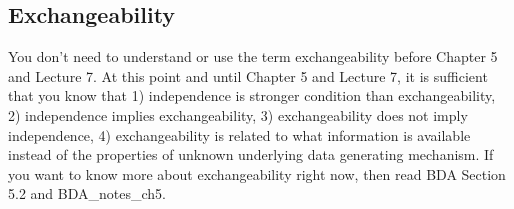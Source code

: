 \documentclass[a4paper,11pt,english]{article}
\begin{document}
\subsection*{Exchangeability}

You don't need to understand or use the term exchangeability before
Chapter 5 and Lecture 7. At this point and until Chapter 5 and Lecture
7, it is sufficient that you know that 1) independence is stronger
condition than exchangeability, 2) independence implies
exchangeability, 3) exchangeability does not imply independence, 4)
exchangeability is related to what information is available instead of
the properties of unknown underlying data generating mechanism.  If
you want to know more about exchangeability right now, then read BDA
Section 5.2 and BDA\_notes\_ch5.
\end{document}
